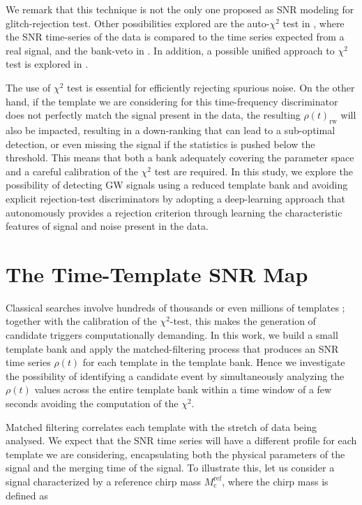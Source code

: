 \documentclass[aps,prd,twocolumn,superscriptaddress,nofootinbib, longbibliography]{revtex4-2}
\begin{document}
	We remark that this technique is not the only one proposed as SNR modeling for glitch-rejection test. Other possibilities explored are the auto-$\chi^2$ test in \cite{Messick_2017}, where the SNR time-series of the data is compared to the time series expected from a real signal, and the bank-veto in \cite{Hanna2008Thesis}. In addition, a possible unified approach to $\chi^2$ test is explored in \cite{Dhurandhar_2017}.

	The use of $\chi^2$ test is essential for efficiently rejecting spurious noise. On the other hand, if the template we are considering for this time-frequency discriminator does not perfectly match the signal present in the data, the resulting $\rho(t)_\mathrm{rw}$ will also be impacted, resulting in a down-ranking that can lead to a sub-optimal detection, or even missing the signal if the statistics is pushed below the threshold. This means that both a bank adequately covering the parameter space and a careful calibration of the $\chi^2$ test are required. In this study, we explore the possibility of detecting GW signals using a reduced template bank and avoiding explicit rejection-test discriminators by adopting a deep-learning approach that autonomously provides a rejection criterion through learning the characteristic features of signal and noise present in the data.

\section{The Time-Template SNR Map} \label{TTmap}

	Classical searches involve hundreds of thousands or even millions of templates \cite{gwtc4methods}; together with the calibration of the $\chi^2$-test, this makes the generation of candidate triggers computationally demanding. In this work, we build a small template bank and apply the matched-filtering process that produces an SNR time series $\rho(t)$ for each template in the template bank. Hence we investigate the possibility of identifying a candidate event by simultaneously analyzing the $\rho(t)$ values across the entire template bank within a time window of a few seconds avoiding the computation of the $\chi^2$.
	
	Matched filtering correlates each template with the stretch of data being analysed. We expect that the SNR time series will have a different profile for each template we are considering, encapsulating both the physical parameters of the signal and the merging time of the signal. To illustrate this, let us consider a signal characterized by a reference chirp mass $M_\mathrm{c}^\mathrm{ref}$, where the chirp mass is defined as
\end{document}
